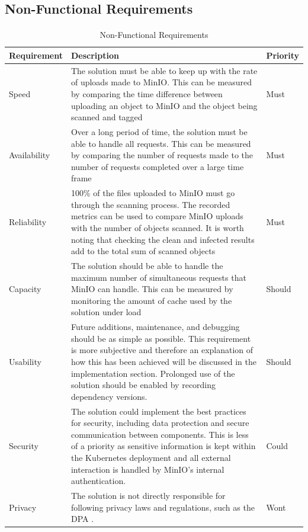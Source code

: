 \documentclass[12pt, conference, final, a4paper, onecolumn, compsoc]{IEEEtran}
\begin{document}
\subsection{Non-Functional Requirements}
\paragraph{}

\begin{table}[H]
  \centering
  \begin{tabular}{|l|p{}|l|}
    \hline
    \textbf{Requirement} & \textbf{Description} & \textbf{Priority} \\ \hline
    Speed & The solution must be able to keep up with the rate of uploads made to MinIO. This can be measured by comparing the time difference between uploading an object to MinIO and the object being scanned and tagged & Must \\ \hline
    Availability & Over a long period of time, the solution must be able to handle all requests. This can be measured by comparing the number of requests made to the number of requests completed over a large time frame & Must \\ \hline
    Reliability & 100\% of the files uploaded to MinIO must go through the scanning process. The recorded metrics can be used to compare MinIO uploads with the number of objects scanned. It is worth noting that checking the clean and infected results add to the total sum of scanned objects & Must \\ \hline
    Capacity & The solution should be able to handle the maximum number of simultaneous requests that MinIO can handle. This can be measured by monitoring the amount of cache used by the solution under load & Should \\ \hline
    Usability & Future additions, maintenance, and debugging should be as simple
                as possible. This requirement is more subjective and therefore
                an explanation of how this has been achieved will be discussed
                in the implementation section. Prolonged use of the solution
                should be enabled by recording dependency versions. & Should \\ \hline
    Security & The solution could implement the best practices for security,
               including data protection and secure communication between
               components. This is less of a priority as sensitive information
               is kept within the Kubernetes deployment and all external
               interaction is handled by MinIO's internal authentication. & Could \\ \hline
    Privacy & The solution is not directly responsible for following privacy
              laws and regulations, such as the DPA \citep{dpa}. & Wont \\ \hline
  \end{tabular}
  \caption{Non-Functional Requirements}
  \label{tab:non_functional_requirements}
\end{table}
\end{document}
